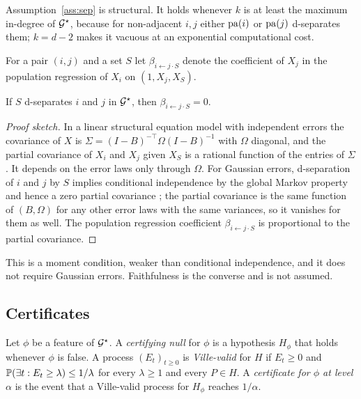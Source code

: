 Assumption~\ref{ass:sep} is structural. It holds whenever $k$ is at least the
maximum in-degree of $\mathcal{G}^{\star}$, because for non-adjacent $i,j$ either
$\mathrm{pa}(i)$ or $\mathrm{pa}(j)$ d-separates them; $k=d-2$ makes it vacuous at an
exponential computational cost.

For a pair $(i,j)$ and a set $S$ let $\beta_{i\leftarrow j\cdot S}$ denote the
coefficient of $X_j$ in the population regression of $X_i$ on
$(1,X_j,X_S)$.

\begin{lemma}\label{lem:partial}
If $S$ d-separates $i$ and $j$ in $\mathcal{G}^{\star}$, then
$\beta_{i\leftarrow j\cdot S}=0$.
\end{lemma}

\begin{proof}[Proof sketch]
In a linear structural equation model with independent errors the covariance of
$X$ is $\Sigma=(I-B)^{-\top}\Omega(I-B)^{-1}$ with $\Omega$ diagonal, and the
partial covariance of $X_i$ and $X_j$ given $X_S$ is a rational function of the
entries of $\Sigma$. It depends on the error laws only through $\Omega$. For
Gaussian errors, d-separation of $i$ and $j$ by $S$ implies conditional
independence by the global Markov property and hence a zero partial covariance
\citep{spirtes2000causation}; the partial covariance is the same function of
$(B,\Omega)$ for any other error laws with the same variances, so it vanishes
for them as well. The population regression coefficient $\beta_{i\leftarrow
j\cdot S}$ is proportional to the partial covariance.
\end{proof}

\noindent This is a moment condition, weaker than conditional independence, and
it does not require Gaussian errors. Faithfulness is the converse and is not
assumed.

\subsection{Certificates}\label{sec:principle}

\begin{definition}\label{def:cert}
Let $\phi$ be a feature of $\mathcal{G}^{\star}$. A \emph{certifying null} for $\phi$ is a
hypothesis $H_\phi$ that holds whenever $\phi$ is false. A process
$(E_t)_{t\ge 0}$ is \emph{Ville-valid} for $H$ if $E_t\ge 0$ and
$\mathbb{P}(\exists t: E_t\ge\lambda)\le 1/\lambda$ for every $\lambda\ge 1$ and every
$P\in H$. A \emph{certificate for $\phi$ at level $\alpha$} is the event that a
Ville-valid process for $H_\phi$ reaches $1/\alpha$.
\end{definition}

